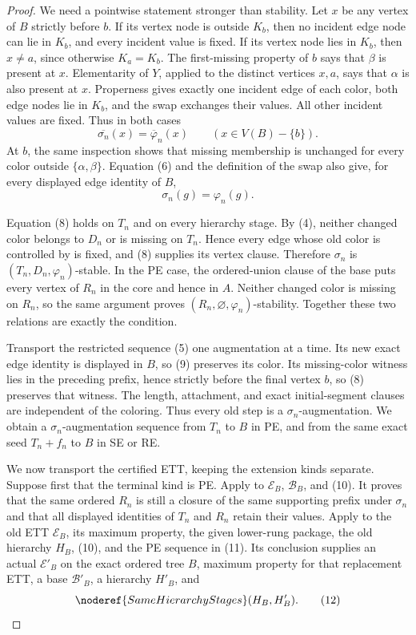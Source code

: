 \begin{proof}
We need a pointwise statement stronger than stability.  Let $x$ be any
vertex of $B$ strictly before $b$.  If its vertex node is outside $K_b$,
then no incident edge node can lie in $K_b$, and every incident value is
fixed.  If its vertex node lies in $K_b$, then $x\ne a$, since otherwise
$K_a=K_b$.  The first-missing property of $b$ says that $\beta$ is
present at $x$.  Elementarity of $Y$, applied to the distinct vertices
$x,a$, says that $\alpha$ is also present at $x$.  Properness gives
exactly one incident edge of each color, both edge nodes lie in $K_b$,
and the swap exchanges their values.  All other incident values are
fixed.  Thus in both cases
\[
       \overline{\sigma_n}(x)=\overline\varphi_n(x)
       \qquad(x\in V(B)-\{b\}).                                \tag{8}
\]
At $b$, the same inspection shows that missing membership is unchanged
for every color outside $\{\alpha,\beta\}$.  Equation (6) and the
definition of the swap also give, for every displayed edge identity of
$B$,
\[
                         \sigma_n(g)=\varphi_n(g).              \tag{9}
\]

Equation (8) holds on $T_n$ and on every hierarchy stage.  By (4), neither
changed color belongs to $D_n$ or is missing on $T_n$.  Hence every edge
whose old color is controlled by
 is fixed, and (8) supplies its vertex clause.
Therefore $\sigma_n$ is $(T_n,D_n,\varphi_n)$-stable.  In the PE case,
the ordered-union clause of the base puts every vertex of $R_n$ in the
core and hence in $A$.  Neither changed color is missing on $R_n$, so the
same argument proves $(R_n,\varnothing,\varphi_n)$-stability.  Together
these two relations are exactly the
 condition.                      

Transport the restricted sequence (5) one augmentation at a time.  Its
new exact edge identity is displayed in $B$, so (9) preserves its color.
Its missing-color witness lies in the preceding prefix, hence strictly
before the final vertex $b$, so (8) preserves that witness.  The length,
attachment, and exact initial-segment clauses are independent of the
coloring.  Thus every old step is a $\sigma_n$-augmentation.  We obtain
a $\sigma_n$-augmentation sequence from $T_n$ to $B$ in PE, and from the
same exact seed $T_n+f_n$ to $B$ in SE or RE.                    

We now transport the certified ETT, keeping the extension kinds separate.
Suppose first that the terminal kind is PE.  Apply
 to $\mathcal E_B$,
$\mathcal B_B$, and (10).  It proves that the same ordered $R_n$ is still
a closure of the same supporting prefix under $\sigma_n$ and that all
displayed identities of $T_n$ and $R_n$ retain their values.  Apply
 to the old ETT $\mathcal E_B$, its maximum
property, the given lower-rung package, the old hierarchy $H_B$, (10),
and the PE sequence in (11).  Its conclusion supplies an actual
 $\mathcal E'_B$ on the exact
ordered tree $B$, maximum property for that replacement ETT, a base
$\mathcal B'_B$, a hierarchy $H'_B$, and
\[
             \noderef{SameHierarchyStages}(H_B,H'_B).          \tag{12}
\]


\end{proof}
